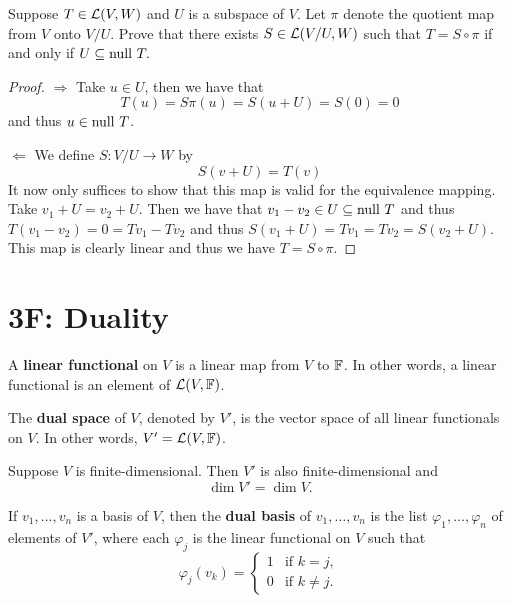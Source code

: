 \documentclass{extarticle}
\begin{document}
\begin{problem}{19}
    Suppose \(T \in \mathcal{L}(V, W)\) and \(U\) is a subspace of \(V\). Let \(\pi\) denote the quotient 
    map from \(V\) onto \(V / U\). Prove that there exists \(S \in \mathcal{L}(V/U, W)\) such that 
    \(T = S \circ \pi\) if and only if \(U \subseteq \text{null } T.\)
\end{problem}

\begin{proof}
\(\Rightarrow\) Take \(u \in U\), then we have that 
\[T(u) = S \pi(u) = S(u + U) = S(0) = 0\]
and thus \(u \in \text{null } T\). 

\(\Leftarrow\) We define \(S \colon V / U \to W\) by 
\[S(v + U) = T(v)\]
It now only suffices to show that this map is valid for the equivalence mapping. Take 
\(v_1 + U = v_2 + U\). Then we have that \(v_1 - v_2 \in U \subseteq \text{null } T\) and thus \(T(v_1 - v_2)
= 0 = T v_1 - T v_2\) and thus \(S(v_1 + U) = T v_1 = Tv_2 = S(v_2 + U)\). This map is clearly 
linear and thus we have \(T = S \circ \pi\).  
\end{proof}

\newpage 

\section*{3F: Duality}

\begin{definition}
    A \textbf{linear functional} on \(V\) is a linear map from \(V\) to \(\mathbb{F}\). In other words, 
    a linear functional is an element of \(\mathcal{L}(V, \mathbb{F})\). 
\end{definition}

\begin{definition}
    The \textbf{dual space} of \(V\), denoted by \(V'\), is the vector space of all linear 
    functionals on \(V\). In other words, \(V' = \mathcal{L}(V, \mathbb{F})\). 
\end{definition}

\begin{lemma}
    Suppose \(V\) is finite-dimensional. Then \(V'\) is also finite-dimensional and 
    \[\dim V' = \dim V.\]
\end{lemma}

\begin{definition}
    If \(v_1, \ldots, v_n\) is a basis of \(V\), then the \textbf{dual basis} of 
    \(v_1, \ldots, v_n\) is the list \(\varphi_1, \ldots, \varphi_n\) of elements 
    of \(V'\), where each \(\varphi_j\) is the linear functional on \(V\) such that 
    \[\varphi_j(v_k) = \begin{cases}
        1 &\text{if } k = j, \\ 
        0 &\text{if } k \neq j.
    \end{cases}\]
\end{definition}
\end{document}
